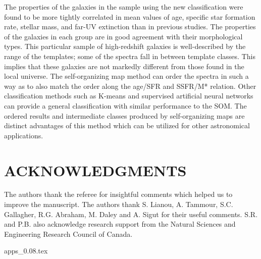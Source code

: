 \documentclass[useAMS,usenatbib]{mn2e}
\begin{document}
    The properties of the galaxies in the  sample using the new classification were found to be more tightly correlated in mean values of age, specific star formation rate, stellar mass, and far-UV extinction than in previous studies. 
    The properties of the galaxies in each group are in good agreement with their morphological types.
    This particular sample of high-redshift galaxies is well-described by the range of the  templates; some of the spectra fall in between template classes. 
    This implies that these galaxies are not markedly different from those found in the local universe.
    The self-organizing map method can order the spectra in such a way as to also match the order along the age/SFR and SSFR/M* relation.
     Other classification methods such as K-means and supervised artificial neural networks can provide a general classification with similar performance to the SOM. The ordered results and intermediate classes produced by self-organizing maps are distinct advantages of this method which can be utilized for other astronomical applications.


\section*{ACKNOWLEDGMENTS}
The authors thank the referee for insightful comments which helped us to improve the manuscript.
The authors thank S. Lianou, A. Tammour, S.C. Gallagher, R.G. Abraham, M. Daley and A. Sigut for their useful comments. 
S.R. and P.B. also acknowledge research support from the Natural Sciences and Engineering Research Council of Canada. 



{apps_0.08.tex}
\end{document}
